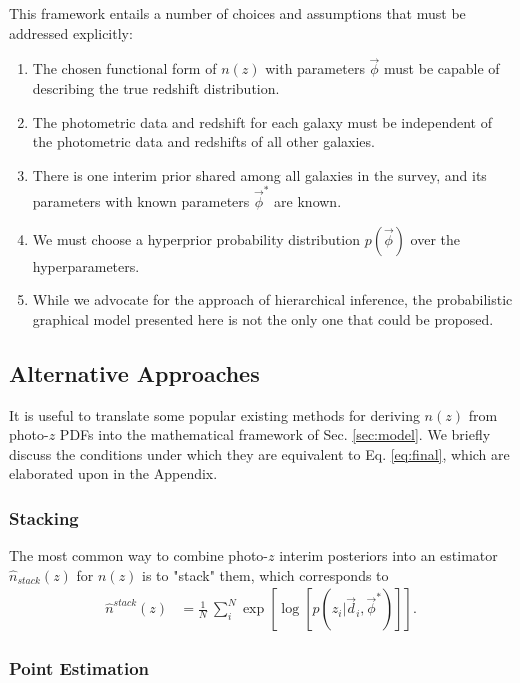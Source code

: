 \documentclass[iop]{emulateapj}
\begin{document}
This framework entails a number of choices and assumptions that must be 
addressed explicitly:
\begin{enumerate}
	\item The chosen functional form of $n(z)$ with parameters $\vec{\phi}$ 
must be capable of describing the true redshift distribution.
	\item The photometric data and redshift for each galaxy must be 
independent of the photometric data and redshifts of all other galaxies.
	\item There is one interim prior shared among all galaxies in the 
survey, and its parameters with known parameters $\vec{\phi}^{*}$ are known.
	\item We must choose a hyperprior probability distribution 
$p(\vec{\phi})$ over the hyperparameters.
	\item While we advocate for the approach of hierarchical inference, the 
probabilistic graphical model presented here is not the only one that could be 
proposed.
\end{enumerate}

\subsection{Alternative Approaches}
\label{sec:others}

It is useful to translate some popular existing methods for deriving $n(z)$ 
from photo-$z$ PDFs into the mathematical framework of Sec. \ref{sec:model}.  
We briefly discuss the conditions under which they are equivalent to Eq. 
\ref{eq:final}, which are elaborated upon in the Appendix.

\subsubsection{Stacking}
\label{sec:stacking}

The most common way to combine photo-$z$ interim posteriors into an estimator 
$\hat{n}_{stack}(z)$ for $n(z)$ is to "stack" them, which corresponds to
\begin{align}
\label{eq:stack}
\hat{n}^{stack}(z) &= \frac{1}{N}\ \sum_{i}^{N} \exp\left[\log[p(z_{i} | 
\vec{d}_{i}, \vec{\phi}^{*})]\right].
\end{align}

\subsubsection{Point Estimation}
\label{sec:point_estimation}
\end{document}
